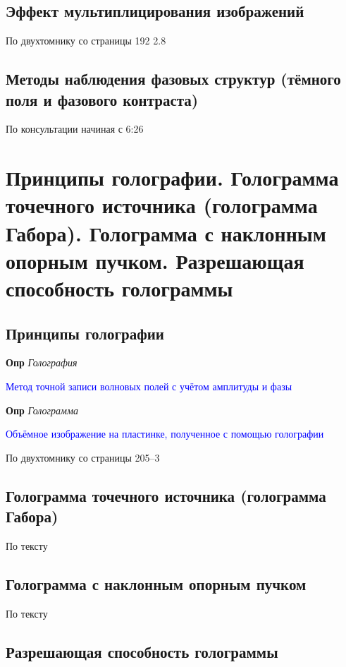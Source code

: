 \documentclass[a4paper, 14pt]{article}
\begin{document}
    \subsection{Эффект мультиплицирования изображений}
    
    По двухтомнику со страницы 192 2.8
    
    \subsection{Методы наблюдения фазовых структур (тёмного поля и фазового контраста)}
    
    По консультации начиная с 6:26
    
    \section{Принципы голографии.
    Голограмма точечного источника (голограмма Габора).
    Голограмма с наклонным опорным пучком.
    Разрешающая способность голограммы}
    
    \subsection{Принципы голографии}
    
    \textbf{Опр} \textit{Голография}
    
    \textcolor{blue}{Метод точной записи волновых полей с учётом амплитуды и фазы}
    
    \textbf{Опр} \textit{Голограмма}
    
    \textcolor{blue}{Объёмное изображение на пластинке, полученное с помощью голографии}
    
    По двухтомнику со страницы 205--3
    
    \subsection{Голограмма точечного источника (голограмма Габора)}
    
    По тексту
    
    \subsection{Голограмма с наклонным опорным пучком}
    
    По тексту
    
    \subsection{Разрешающая способность голограммы}
    
\end{document}
